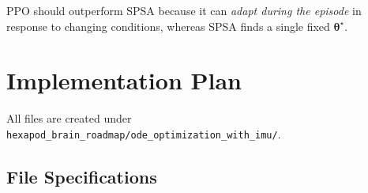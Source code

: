 \documentclass[11pt]{article}
\begin{document}
PPO should outperform SPSA because it can \emph{adapt during the episode} in response to changing conditions, whereas SPSA finds a single fixed $\boldsymbol{\theta}^\star$.

\section{Implementation Plan}
\label{sec:implementation}

All files are created under \texttt{hexapod\_brain\_roadmap/ode\_optimization\_with\_imu/}.

\subsection{File Specifications}
\end{document}
